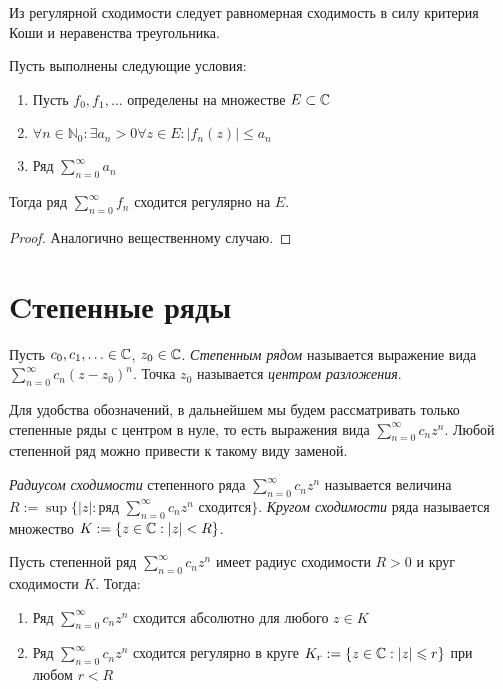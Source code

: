 \begin{note}
	Из регулярной сходимости следует равномерная сходимость в силу критерия Коши и неравенства треугольника.
\end{note}

\begin{theorem}
	Пусть выполнены следующие условия:
	\begin{enumerate}
		\item Пусть $f_0, f_1, \dotsc$ определены на множестве $E \subset \mathbb{C}$
		\item $\forall n \in \mathbb{N}_0 : \exists a_n > 0 \forall z \in E: |f_n(z)| \le a_n$
		\item Ряд $\sum_{n=0}^\infty a_n$
	\end{enumerate}
	
	Тогда ряд $\sum_{n=0}^\infty f_n$ сходится регулярно на $E$.
\end{theorem}

\begin{proof}
	Аналогично вещественному случаю.
\end{proof}

\section{Cтепенные ряды}

\begin{definition}
	Пусть $c_0, c_1, \dotsc \in \mathbb{C}$, $z_0 \in \mathbb{C}$. \textit{Степенным рядом} называется выражение вида $\sum_{n=0}^\infty c_n(z - z_0)^n$. Точка $z_0$ называется \textit{центром разложения}.
\end{definition}

\begin{note}
	Для удобства обозначений, в дальнейшем мы будем рассматривать только степенные ряды с центром в нуле, то есть выражения вида $\sum_{n=0}^\infty c_nz^n$. Любой степенной ряд можно привести к такому виду заменой.
\end{note}

\pagebreak

\begin{definition}
	\textit{Радиусом сходимости} степенного ряда $\sum_{n=0}^\infty c_nz^n$ называется величина $R := \sup\{|z| : \text{ряд }\sum_{n=0}^\infty c_nz^n\text{ сходится}\}$. \textit{Кругом сходимости} ряда называется множество $K := \{z \in \mathbb{C} : |z| < R\}$.
\end{definition}

\begin{theorem}[Абеля]
	Пусть степенной ряд $\sum_{n=0}^\infty c_nz^n$ имеет радиус сходимости $R > 0$ и круг сходимости $K$. Тогда:
	\begin{enumerate}
		\item Ряд $\sum_{n=0}^\infty c_nz^n$ сходится абсолютно для любого $z \in K$
		\item Ряд $\sum_{n=0}^\infty c_nz^n$ сходится регулярно в круге $K_r := \{z \in \mathbb{C}: |z| \leqslant r\}$ при любом $r < R$
	\end{enumerate}
\end{theorem}

